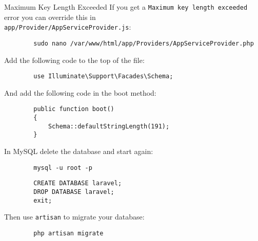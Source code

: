 \begin{infobox}{Maximum Key Length Exceeded}
    If you get a \texttt{Maximum key length exceeded} error you can override this in\\ \texttt{app/Provider/AppServiceProvider.js}:

    \begin{verbatim}
        sudo nano /var/www/html/app/Providers/AppServiceProvider.php
    \end{verbatim}

    Add the following code to the top of the file:

    \begin{verbatim}
        use Illuminate\Support\Facades\Schema;
    \end{verbatim}

    And add the following code in the boot method:

    \begin{verbatim}
        public function boot()
        {
            Schema::defaultStringLength(191);
        }
    \end{verbatim}

    In MySQL delete the database and start again:

    \begin{verbatim}
        mysql -u root -p
    \end{verbatim}

    \begin{verbatim}
        CREATE DATABASE laravel;
        DROP DATABASE laravel;
        exit;
    \end{verbatim}

    Then use \texttt{artisan} to migrate your database:

    \begin{verbatim}
        php artisan migrate
    \end{verbatim}
\end{infobox}
